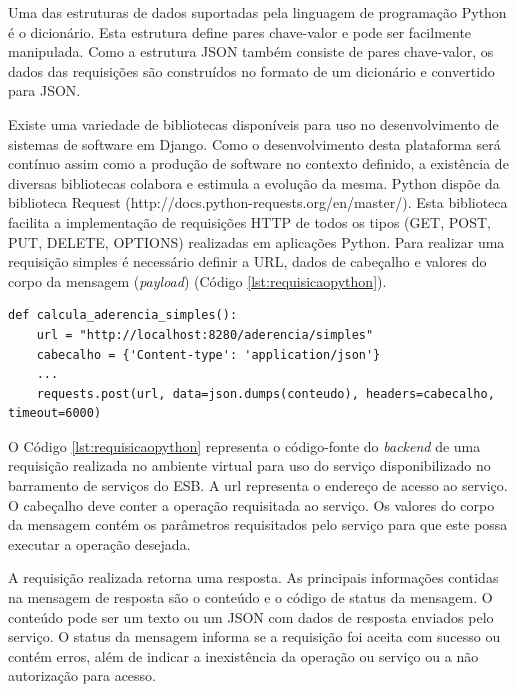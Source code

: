 Uma das estruturas de dados suportadas pela linguagem de programação Python é o dicionário. Esta estrutura define pares chave-valor e pode ser facilmente manipulada. Como a estrutura JSON também consiste de pares chave-valor, os dados das requisições são construídos no formato de um dicionário e convertido para JSON.

Existe uma variedade de bibliotecas disponíveis para uso no desenvolvimento de sistemas de software em Django. Como o desenvolvimento desta plataforma será contínuo assim como a produção de software no contexto definido, a existência de diversas bibliotecas colabora e estimula a evolução da mesma. Python dispõe da biblioteca Request (http://docs.python-requests.org/en/master/). Esta biblioteca facilita a implementação de requisições HTTP de todos os tipos (GET, POST, PUT, DELETE, OPTIONS) realizadas em aplicações Python. Para realizar uma requisição simples é necessário definir a URL, dados de cabeçalho e valores do corpo da mensagem (\textit{payload}) (Código \ref{lst:requisicaopython}).


\begin{lstlisting}[caption={Requisição HTTP em Python utilizando a biblioteca Request.},label={lst:requisicaopython}]
def calcula_aderencia_simples():
    url = "http://localhost:8280/aderencia/simples"
    cabecalho = {'Content-type': 'application/json'}
    ...
    requests.post(url, data=json.dumps(conteudo), headers=cabecalho, timeout=6000)
\end{lstlisting}

O Código \ref{lst:requisicaopython} representa o código-fonte do \textit{backend} de uma requisição realizada no ambiente virtual para uso do serviço disponibilizado no barramento de serviços do ESB. A url representa o endereço de acesso ao serviço. O cabeçalho deve conter a operação requisitada ao serviço. Os valores do corpo da mensagem contém os parâmetros requisitados pelo serviço para que este possa executar a operação desejada.

A requisição realizada retorna uma resposta. As principais informações contidas na mensagem de resposta são o conteúdo e o código de status da mensagem. O conteúdo pode ser um texto ou um JSON com dados de resposta enviados pelo serviço. O status da mensagem informa se a requisição foi aceita com sucesso ou contém erros, além de indicar a inexistência da operação ou serviço ou a não autorização para acesso.

